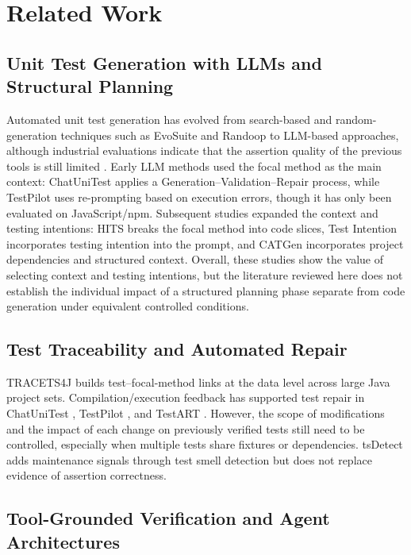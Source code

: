\documentclass[pdflatex,sn-basic,Numbered,iicol]{sn-jnl}
\begin{document}
\section{Related Work}\label{sec:related-work}

\subsection{Unit Test Generation with LLMs and Structural Planning}\label{subsec:rw-generation}

Automated unit test generation has evolved from search-based and random-generation techniques such as EvoSuite \cite{bib1} and Randoop \cite{bib2} to LLM-based approaches, although industrial evaluations indicate that the assertion quality of the previous tools is still limited \cite{bib3}. Early LLM methods used the focal method as the main context: ChatUniTest \cite{bib4} applies a Generation--Validation--Repair process, while TestPilot \cite{bib5} uses re-prompting based on execution errors, though it has only been evaluated on JavaScript/npm. Subsequent studies expanded the context and testing intentions: HITS \cite{bib6} breaks the focal method into code slices, Test Intention \cite{bib7} incorporates testing intention into the prompt, and CATGen \cite{bib29} incorporates project dependencies and structured context. Overall, these studies show the value of selecting context and testing intentions, but the literature reviewed here does not establish the individual impact of a structured planning phase separate from code generation under equivalent controlled conditions.

\subsection{Test Traceability and Automated Repair}\label{subsec:rw-traceability}

TRACETS4J \cite{bib10} builds test--focal-method links at the data level across large Java project sets. Compilation/execution feedback has supported test repair in ChatUniTest \cite{bib4}, TestPilot \cite{bib5}, and TestART \cite{bib27}. However, the scope of modifications and the impact of each change on previously verified tests still need to be controlled, especially when multiple tests share fixtures or dependencies. tsDetect \cite{bib25} adds maintenance signals through test smell detection but does not replace evidence of assertion correctness.

\subsection{Tool-Grounded Verification and Agent Architectures}\label{subsec:rw-verification}
\end{document}
